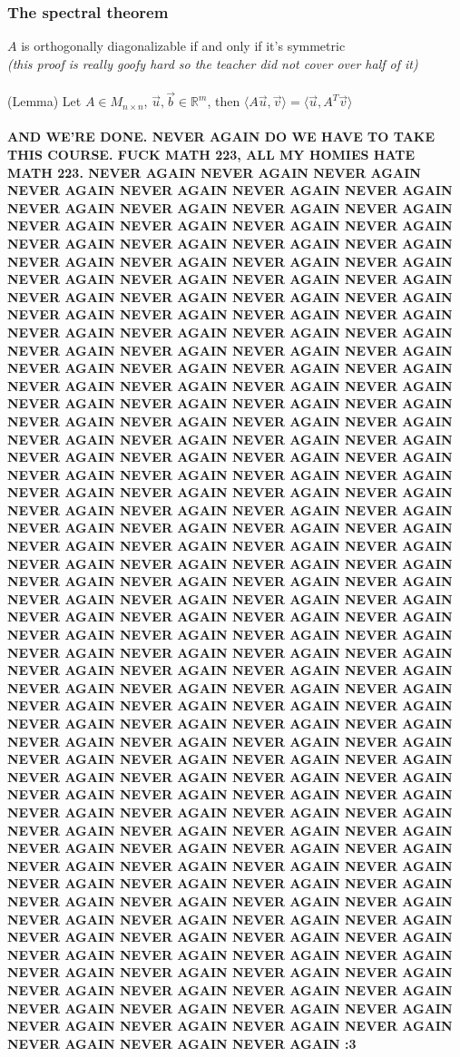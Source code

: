 \documentclass{article}
\begin{document}
\subsubsection{The spectral theorem}
$A$ is orthogonally diagonalizable if and only if it's symmetric \\\textit{(this proof is really goofy hard so the teacher did not cover over half of it)}\\\\
(Lemma) Let $A\in M_{n\times n}$, $\overrightarrow{u},\overrightarrow{b}\in \mathds{R}^m$, then $\langle A\overrightarrow{u},\overrightarrow{v}\rangle=\langle\overrightarrow{u},A^T\overrightarrow{v}\rangle$
\\\\
\huge{\textbf{AND WE'RE DONE. NEVER AGAIN DO WE HAVE TO TAKE THIS COURSE. FUCK MATH 223, ALL MY HOMIES HATE MATH 223. NEVER AGAIN NEVER AGAIN NEVER AGAIN NEVER AGAIN NEVER AGAIN NEVER AGAIN NEVER AGAIN NEVER AGAIN NEVER AGAIN NEVER AGAIN NEVER AGAIN NEVER AGAIN NEVER AGAIN NEVER AGAIN NEVER AGAIN NEVER AGAIN NEVER AGAIN NEVER AGAIN NEVER AGAIN NEVER AGAIN NEVER AGAIN NEVER AGAIN NEVER AGAIN NEVER AGAIN NEVER AGAIN NEVER AGAIN NEVER AGAIN NEVER AGAIN NEVER AGAIN NEVER AGAIN NEVER AGAIN NEVER AGAIN NEVER AGAIN NEVER AGAIN NEVER AGAIN NEVER AGAIN NEVER AGAIN NEVER AGAIN NEVER AGAIN NEVER AGAIN NEVER AGAIN NEVER AGAIN NEVER AGAIN NEVER AGAIN NEVER AGAIN NEVER AGAIN NEVER AGAIN NEVER AGAIN NEVER AGAIN NEVER AGAIN NEVER AGAIN NEVER AGAIN NEVER AGAIN NEVER AGAIN NEVER AGAIN NEVER AGAIN NEVER AGAIN NEVER AGAIN NEVER AGAIN NEVER AGAIN NEVER AGAIN NEVER AGAIN NEVER AGAIN NEVER AGAIN NEVER AGAIN NEVER AGAIN NEVER AGAIN NEVER AGAIN NEVER AGAIN NEVER AGAIN NEVER AGAIN NEVER AGAIN NEVER AGAIN NEVER AGAIN NEVER AGAIN NEVER AGAIN NEVER AGAIN NEVER AGAIN NEVER AGAIN NEVER AGAIN NEVER AGAIN NEVER AGAIN NEVER AGAIN NEVER AGAIN NEVER AGAIN NEVER AGAIN NEVER AGAIN NEVER AGAIN NEVER AGAIN NEVER AGAIN NEVER AGAIN NEVER AGAIN NEVER AGAIN NEVER AGAIN NEVER AGAIN NEVER AGAIN NEVER AGAIN NEVER AGAIN NEVER AGAIN NEVER AGAIN NEVER AGAIN NEVER AGAIN NEVER AGAIN NEVER AGAIN NEVER AGAIN NEVER AGAIN NEVER AGAIN NEVER AGAIN NEVER AGAIN NEVER AGAIN NEVER AGAIN NEVER AGAIN NEVER AGAIN NEVER AGAIN NEVER AGAIN NEVER AGAIN NEVER AGAIN NEVER AGAIN NEVER AGAIN NEVER AGAIN NEVER AGAIN NEVER AGAIN NEVER AGAIN NEVER AGAIN NEVER AGAIN NEVER AGAIN NEVER AGAIN NEVER AGAIN NEVER AGAIN NEVER AGAIN NEVER AGAIN NEVER AGAIN NEVER AGAIN NEVER AGAIN NEVER AGAIN NEVER AGAIN NEVER AGAIN NEVER AGAIN NEVER AGAIN NEVER AGAIN NEVER AGAIN NEVER AGAIN NEVER AGAIN NEVER AGAIN NEVER AGAIN NEVER AGAIN NEVER AGAIN NEVER AGAIN NEVER AGAIN NEVER AGAIN NEVER AGAIN NEVER AGAIN NEVER AGAIN NEVER AGAIN NEVER AGAIN NEVER AGAIN NEVER AGAIN NEVER AGAIN NEVER AGAIN NEVER AGAIN NEVER AGAIN NEVER AGAIN NEVER AGAIN NEVER AGAIN NEVER AGAIN NEVER AGAIN NEVER AGAIN NEVER AGAIN NEVER AGAIN NEVER AGAIN NEVER AGAIN NEVER AGAIN NEVER AGAIN NEVER AGAIN NEVER AGAIN NEVER AGAIN NEVER AGAIN NEVER AGAIN NEVER AGAIN NEVER AGAIN NEVER AGAIN NEVER AGAIN NEVER AGAIN NEVER AGAIN NEVER AGAIN NEVER AGAIN NEVER AGAIN NEVER AGAIN NEVER AGAIN NEVER AGAIN NEVER AGAIN NEVER AGAIN NEVER AGAIN NEVER AGAIN NEVER AGAIN NEVER AGAIN NEVER AGAIN NEVER AGAIN \newpage :3}}
\end{document}
